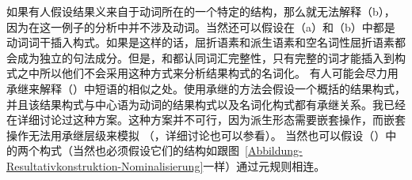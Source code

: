 %
    如果有人假设结果义来自于动词所在的一个特定的结构，那么就无法解释（b），因为在这一例子的分析中并不涉及动词。当然还可以假设在（a）和（b）中都是动词词干插入构式。如果是这样的话，屈折语素和派生语素和空名词性屈折语素都会成为独立的句法成分。但是，\citet[]{Goldberg2003a}和\citet{ADT2013a}都认同词汇完整性，只有完整的词才能插入到构式之中所以他们不会采用这种方式来分析结果构式的名词化。
    有人可能会尽力用承继来解释（）中短语的相似之处。使用承继的方法会假设一个概括的结果构式，并且该结果构式与中心语为动词的结果构式以及名词化构式都有承继关系。我已经在详细讨论过这种方案。这种方案并不可行，因为派生形态需要嵌套操作，而嵌套操作无法用承继层级来模拟 （，详细讨论也可以参看）。
    当然也可以假设（）中的两个构式（当然也必须假设它们的结构如跟图~\ref{Abbildung-Resultativkonstruktion-Nominalisierung}一样）通过元规则相连。
